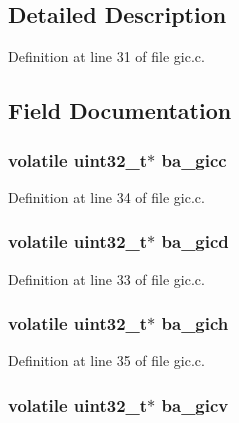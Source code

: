 \subsection{\-Detailed \-Description}


\-Definition at line 31 of file gic.\-c.



\subsection{\-Field \-Documentation}
\hypertarget{structgic_a83c305aab314213445ac83ad517e9be4}{
\subsubsection[{ba\-\_\-gicc}]{\setlength{\rightskip}{0pt plus 5cm}volatile {\bf uint32\-\_\-t}$\ast$ {\bf ba\-\_\-gicc}}}\label{structgic_a83c305aab314213445ac83ad517e9be4}


\-Definition at line 34 of file gic.\-c.

\hypertarget{structgic_a186421525f3bd36a65216cfdc79ce10e}{
\subsubsection[{ba\-\_\-gicd}]{\setlength{\rightskip}{0pt plus 5cm}volatile {\bf uint32\-\_\-t}$\ast$ {\bf ba\-\_\-gicd}}}\label{structgic_a186421525f3bd36a65216cfdc79ce10e}


\-Definition at line 33 of file gic.\-c.

\hypertarget{structgic_aa93c957a17fef2d6779bde6b08f85050}{
\subsubsection[{ba\-\_\-gich}]{\setlength{\rightskip}{0pt plus 5cm}volatile {\bf uint32\-\_\-t}$\ast$ {\bf ba\-\_\-gich}}}\label{structgic_aa93c957a17fef2d6779bde6b08f85050}


\-Definition at line 35 of file gic.\-c.

\hypertarget{structgic_acd803bc08a11a6e6222a8a156390599f}{
\subsubsection[{ba\-\_\-gicv}]{\setlength{\rightskip}{0pt plus 5cm}volatile {\bf uint32\-\_\-t}$\ast$ {\bf ba\-\_\-gicv}}}\label{structgic_acd803bc08a11a6e6222a8a156390599f}


